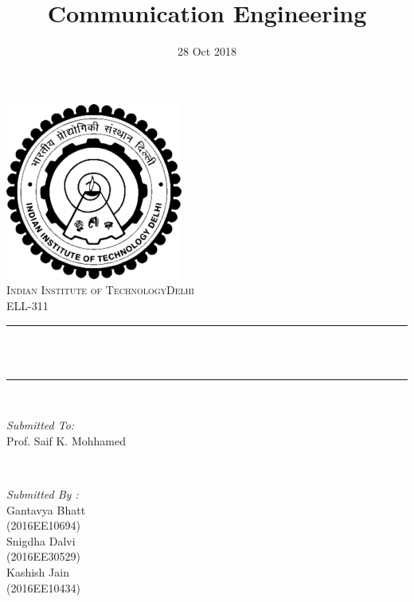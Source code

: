 \documentclass[12pt]{article}
\title{Communication Engineering}								%
\date{28 Oct 2018}											%
\makeatletter
\let\thetitle\@title
\makeatother
\begin{document}

\begin{titlepage}
	\centering
    \vspace*{0.5 cm}
    \includegraphics[scale = 0.75]{iitd.jpg}\\[1.0 cm]	%
    \textsc{\LARGE Indian Institute of Technology\newline\newline Delhi}\\[2.0 cm]	%
	\textsc{\Large ELL-311}\\[0.5 cm]				%
	\rule{\linewidth}{0.2 mm} \\[0.4 cm]
	{ \huge \bfseries \thetitle}\\
	\rule{\linewidth}{0.2 mm} \\[1.5 cm]
	
	\begin{minipage}{0.4\textwidth}
		\begin{flushleft} \large
			\emph{Submitted To:}\\
			Prof. Saif K. Mohhamed\\
			\end{flushleft}
			\end{minipage}~
			\begin{minipage}{0.4\textwidth}
            
			\begin{flushright} \large
			\emph{Submitted By :} \\
			Gantavya Bhatt\\
			(2016EE10694)\\
			Snigdha Dalvi\\
			(2016EE30529)\\
			Kashish Jain\\
			(2016EE10434)\\
		\end{flushright}
        
	\end{minipage}\\[2 cm]
	
	
    
    
    
    
	
\end{titlepage}
\end{document}
